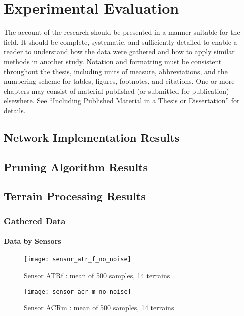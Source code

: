 \chapter{Experimental Evaluation}
\label{chap:results}

The account of the research should be presented in a manner suitable for the field. It should be complete, systematic, and sufficiently detailed to enable a reader to understand how the data were gathered and how to apply similar methods in another study. Notation and formatting must be consistent throughout the thesis, including units of measure, abbreviations, and the numbering scheme for tables, figures, footnotes, and citations. One or more chapters may consist of material published (or submitted for publication) elsewhere. See “Including Published Material in a Thesis or Dissertation” for details.

\section{Network Implementation Results}

\section{Pruning Algorithm Results}

\section{Terrain Processing Results}

\subsection{Gathered Data} \label{ssec:gathered_data}

\subsubsection*{Data by Sensors} \label{sssec:data_by_sensors}

\begin{figure}[H]
  \centering
  \texttt{[image: sensor\_atr\_f\_no\_noise]}
  \caption{Sensor ATRf : mean of 500 samples, 14 terrains}
  \label{fig:sensor_atr_f_no_noise}
\end{figure}

\begin{figure}[H]
  \centering
  \texttt{[image: sensor\_acr\_m\_no\_noise]}
  \caption{Sensor ACRm : mean of 500 samples, 14 terrains}
  \label{fig:sensor_acr_m_no_noise}
\end{figure}

